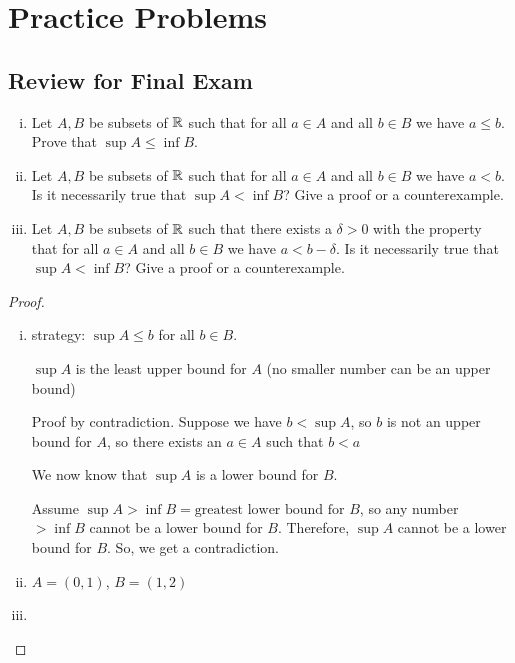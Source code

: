 \chapter{Practice Problems}

\newtheorem{innercustomthm}{Question}
\newenvironment{question}[1]
  {\renewcommand\theinnercustomthm{#1}\innercustomthm}
  {\endinnercustomthm}
\section{Review for Final Exam}
\begin{question}{1}
  \text{}
  \begin{enumerate}[(i)]
    \item Let $A, B$ be subsets of $\mathbb R$ such that for all $a \in A$ and all $b \in B$ we
    have $a \le b$. Prove that $\sup A \le \inf B$.
    \item Let $A, B$ be subsets of $\mathbb R$ such that for all $a \in A$ and all $b \in B$ we
    have $a < b$. Is it necessarily true that $\sup A < \inf B$? Give a proof or a
    counterexample. 
    \item Let $A, B$ be subsets of $\mathbb R$ such that there exists a
    $\delta > 0$ with the property that for all $a \in A$ and all $b \in B$ we have $a < b - \delta$.
    Is it necessarily true that $\sup A < \inf B$? Give a proof or a counterexample.
  \end{enumerate}
\end{question}

\begin{proof}
  \text{}
  \begin{enumerate}[(i)]
    \item strategy: $\sup A \le b$ for all $b \in B$.

    $\sup A$ is the least upper bound for $A$ (no smaller number can be an upper bound)

    Proof by contradiction. 
    Suppose we have $b < \sup A$, so $b$ is not an upper bound for $A$, so there exists an $a \in A$ 
    such that $b < a$

    We now know that $\sup A$ is a lower bound for $B$.

    Assume $\sup A > \inf B = \text{greatest lower bound for } B$, so any number $ > \inf B$ cannot be a lower bound for $B$.
    Therefore, $\sup A$ cannot be a lower bound for $B$.
    So, we get a contradiction.
    \item $A = (0, 1)$, $B = (1, 2)$
    \item 
  \end{enumerate}
\end{proof}

